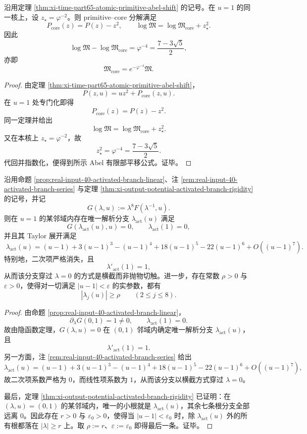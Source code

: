 \begin{theorem}\label{thm:xi-time-part73-two-cycle-abel-finitepart-shift}
沿用定理 \ref{thm:xi-time-part65-atomic-primitive-abel-shift} 的记号。在 \(u=1\) 的同一核上，设 \(z_\star=\varphi^{-2}\)。则 primitive--core 分解满足
\[
P_{\mathrm{core}}(z)=P(z)-z^2,
\qquad
\log\mathfrak M=\log\mathfrak M_{\mathrm{core}}+z_\star^2.
\]
因此
\[
\log\mathfrak M-\log\mathfrak M_{\mathrm{core}}
=
\varphi^{-4}
=
\frac{7-3\sqrt5}{2},
\]
亦即
\[
\mathfrak M_{\mathrm{core}}=e^{-\varphi^{-4}}\mathfrak M.
\]
\end{theorem}
\begin{proof}
由定理 \ref{thm:xi-time-part65-atomic-primitive-abel-shift}，
\[
P(z,u)=uz^2+P_{\mathrm{core}}(z,u).
\]
在 \(u=1\) 处专门化即得
\[
P_{\mathrm{core}}(z)=P(z)-z^2.
\]
同一定理并给出
\[
\log\mathfrak M=\log\mathfrak M_{\mathrm{core}}+z_\star^2.
\]
又在本核上 \(z_\star=\varphi^{-2}\)，故
\[
z_\star^2=\varphi^{-4}=\frac{7-3\sqrt5}{2}.
\]
代回并指数化，便得到所示 Abel 有限部平移公式。证毕。
\end{proof}

\begin{theorem}[激活分支的横截性与二次项消失]\label{thm:xi-time-part73-activated-branch-unique-zero-scale-singularity}
沿用命题 \ref{prop:real-input-40-activated-branch-linear}、注 \ref{rem:real-input-40-activated-branch-series} 与定理 \ref{thm:xi-output-potential-activated-branch-rigidity} 的记号，并记
\[
G(\lambda,u):=\lambda^8F(\lambda^{-1},u).
\]
则在 \(u=1\) 的某邻域内存在唯一解析分支 \(\lambda_{\mathrm{act}}(u)\) 满足
\[
G(\lambda_{\mathrm{act}}(u),u)=0,
\qquad
\lambda_{\mathrm{act}}(1)=0,
\]
并且其 Taylor 展开满足
\[
\boxed{\;
\lambda_{\mathrm{act}}(u)
=(u-1)+3(u-1)^3-(u-1)^4+18(u-1)^5-22(u-1)^6
+O((u-1)^7).\;}
\]
特别地，二次项严格消失，且
\[
\lambda'_{\mathrm{act}}(1)=1,
\]
从而该分支穿过 \(\lambda=0\) 的方式是横截而非抛物切触。进一步，存在常数 \(\rho>0\) 与 \(\varepsilon>0\)，使得对一切满足 \(|u-1|<\varepsilon\) 的实参数，都有
\[
\boxed{\;
|\lambda_j(u)|\ge \rho
\qquad
(2\le j\le 8).\;}
\]
\end{theorem}
\begin{proof}
由命题 \ref{prop:real-input-40-activated-branch-linear}，
\[
\partial_\lambda G(0,1)=1\neq 0,
\qquad
\lambda_{\mathrm{act}}(1)=0.
\]
故由隐函数定理，\(G(\lambda,u)=0\) 在 \((0,1)\) 邻域内确定唯一解析分支 \(\lambda_{\mathrm{act}}(u)\)，且
\[
\lambda'_{\mathrm{act}}(1)=1.
\]
另一方面，注 \ref{rem:real-input-40-activated-branch-series} 给出
\[
\lambda_{\mathrm{act}}(u)
=(u-1)+3(u-1)^3-(u-1)^4+18(u-1)^5-22(u-1)^6
+O((u-1)^7),
\]
故二次项系数严格为 \(0\)，而线性项系数为 \(1\)，从而该分支以横截方式穿过 \(\lambda=0\)。

最后，定理 \ref{thm:xi-output-potential-activated-branch-rigidity} 已证明：在 \((\lambda,u)=(0,1)\) 的某邻域内，唯一的小根就是 \(\lambda_{\mathrm{act}}(u)\)，其余七条根分支全部远离 \(0\)。因此存在 \(r>0\) 与 \(\varepsilon_0>0\)，使得当 \(|u-1|<\varepsilon_0\) 时，除 \(\lambda_{\mathrm{act}}(u)\) 外的所有根都落在 \(|\lambda|\ge r\) 上。取 \(\rho:=r\)、\(\varepsilon:=\varepsilon_0\) 即得最后一条。证毕。
\end{proof}

